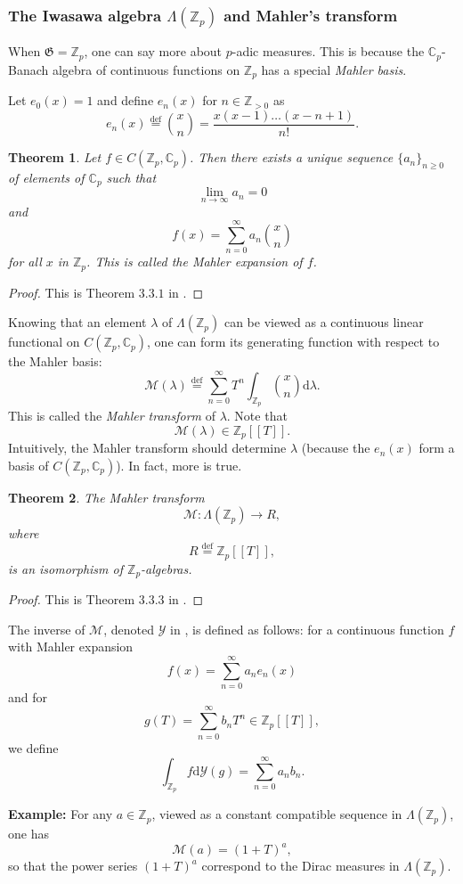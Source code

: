 \documentclass[twoside,10pt]{article}
\newtheorem{theorem}{Theorem}
\newcommand{\rarr}{\rightarrow}
\newcommand{\Z}{\mathbb{Z}}
\newcommand{\C}{\mathbb{C}}
\newcommand{\Gfrak}{\mathfrak{G}}
\newcommand{\curlM}{\mathcal{M}}
\newcommand{\curlY}{\mathcal{Y}}
\newcommand{\eqdef}{\overset{\text{def}}{=}}
\renewcommand{\d}{\text{d}}
\begin{document}
\subsubsection*{The Iwasawa algebra $\Lambda(\Z_p)$ and Mahler's transform}
When $\Gfrak=\Z_p$, one can say more about $p$-adic measures. This is because the $\C_p$-Banach algebra of continuous functions on $\Z_p$ has a special \emph{Mahler basis}.

Let $e_0(x)=1$ and define $e_n(x)$ for $n\in\Z_{>0}$ as
\[e_n(x)\eqdef\binom{x}{n}=\frac{x(x-1)\dots(x-n+1)}{n!}.\]

\begin{theorem}
	Let $f\in C(\Z_p,\C_p)$. Then there exists a unique sequence $\{a_n\}_{n\geq 0}$ of elements of $\C_p$ such that
	\[\lim_{n\rightarrow\infty}a_n=0\]
	and
	\[f(x)=\sum_{n=0}^\infty a_n\binom{x}{n}\]
	for all $x$ in $\Z_p$. This is called the Mahler expansion of $f$.
\end{theorem}
\begin{proof}
	This is Theorem $3.3.1$ in \cite{CS}.
\end{proof}

Knowing that an element $\lambda$ of $\Lambda(\Z_p)$ can be viewed as a continuous linear functional on $ C(\Z_p,\C_p)$, one can form its generating function with respect to the Mahler basis:
\[\curlM(\lambda)\eqdef\sum_{n=0}^\infty T^n\int_{\Z_p}\binom{x}{n}\d\lambda.\]
This is called the \emph{Mahler transform} of $\lambda$. Note that
\[\curlM(\lambda)\in\Z_p[[T]].\]
Intuitively, the Mahler transform should determine $\lambda$ (because the $e_n(x)$ form a basis of $C(\Z_p,\C_p)$). In fact, more is true.

\begin{theorem}
	The Mahler transform
	\[\curlM:\Lambda(\Z_p)\rarr R,\]	
	where
	\[R\eqdef\Z_p[[T]],\]
	is an isomorphism of $\Z_p$-algebras.
\end{theorem}
\begin{proof}
	This is Theorem $3.3.3$ in \cite{CS}.
\end{proof}

The inverse of $\curlM$, denoted $\curlY$ in \cite{CS}, is defined as follows: for a continuous function $f$ with Mahler expansion
\[f(x)=\sum_{n=0}^\infty a_n e_n(x)\]
and for
\[g(T)=\sum_{n=0}^\infty b_nT^n\in\Z_p[[T]],\]
we define
\[\int_{\Z_p} f\d\curlY(g)=\sum_{n=0}^\infty a_nb_n.\]

\textbf{Example: } For any $a\in\Z_p$, viewed as a constant compatible sequence in $\Lambda(\Z_p)$, one has
\[\curlM(a)=(1+T)^a,\]
so that the power series $(1+T)^a$ correspond to the Dirac measures in $\Lambda(\Z_p)$.
\end{document}
